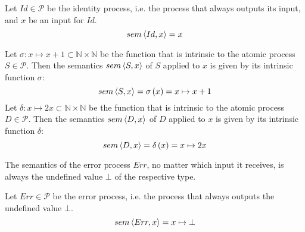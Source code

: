 

\begin{definition}
\label{def:sem_id}
Let $Id \in \mathcal{P}$ be the identity process, i.e. the process that always outputs its input, and $x$ be an input for $Id$.
\begin{equation}
  \label{eqn:sem_id}
  sem \left\langle Id, x \right\rangle = x
\end{equation}
\hfill\qedsymbol
\end{definition}


\begin{example}
  \label{exp:sem_atomic}
  Let $\sigma \colon x \mapsto x+1 \subset \mathbb{N} \times \mathbb{N}$ be the function that is intrinsic to the atomic process $S \in \mathcal{P}$. Then the semantics $sem \left\langle S, x \right\rangle$ of $S$ applied to $x$ is given by its intrinsic function $\sigma$:
  \begin{equation}
    sem \left\langle S, x \right\rangle = \sigma \left( x \right) = x \mapsto x+1
  \end{equation}
  Let $\delta \colon x \mapsto 2x \subset \mathbb{N} \times \mathbb{N}$ be the function that is intrinsic to the atomic process $D \in \mathcal{P}$. Then the semantics $sem \left\langle D, x \right\rangle$ of $D$ applied to $x$ is given by its intrinsic function $\delta$:
  \begin{equation}
    sem \left\langle D, x \right\rangle = \delta \left( x \right) = x \mapsto 2x
  \end{equation}
  \hfill\qedsymbol
\end{example}


The semantics of the error process $Err$, no matter which input it receives, is always the undefined value $\bot$ of the respective type. 
\begin{definition}
\label{def:sem_err}
Let $Err \in \mathcal{P}$ be the error process, i.e. the process that always outputs the undefined value $\bot$.
  \begin{equation}
    \label{eqn:sem_error}
    sem \left\langle Err, x \right\rangle = x \mapsto \bot
  \end{equation}
  \hfill\qedsymbol
\end{definition}

